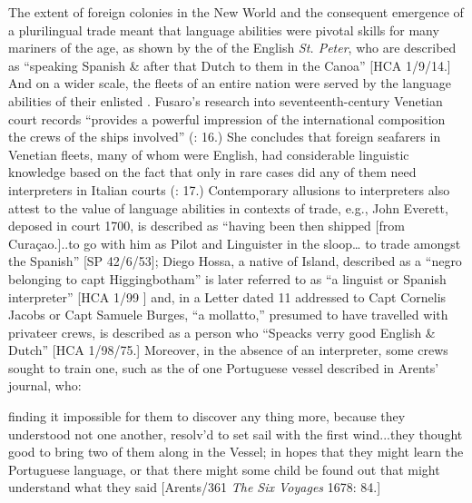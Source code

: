 The extent of foreign colonies in the New World and the consequent emergence of a plurilingual  trade meant that language abilities were pivotal skills for many mariners of the age, as shown by the  of the English \textit{St. Peter}, who are described as “speaking Spanish \& after that Dutch to them in the Canoa” [HCA 1/9/14.] And on a wider scale, the  fleets of an entire nation were served by the language abilities of their enlisted . Fusaro’s research into seventeenth-century Venetian court records “provides a powerful impression of the international composition the crews of the ships involved” (\citeyear*{Fusaro2015}: 16.) She concludes that foreign seafarers in Venetian fleets, many of whom were English, had considerable linguistic knowledge based on the fact that only in rare cases did any of them need interpreters in Italian courts (\citealt{Fusaro2015}: 17.) Contemporary allusions to interpreters also attest to the value of language abilities in contexts of trade, e.g., John Everett, deposed in court 1700, is described as “having been then shipped [from Curaçao.]..to go with him as Pilot and Linguister in the sloop… to trade amongst the Spanish” [SP 42/6/53]; Diego Hossa, a native of  Island, described as a “negro belonging to capt Higgingbotham” is later referred to as “a linguist or Spanish interpreter” [HCA 1/99  \citealt{Islands1722}] and, in a Letter dated 11 \citealt{January1697} addressed to Capt Cornelis Jacobs or Capt Samuele Burges, “a mollatto,” presumed to have travelled with privateer crews, is described as a person who “Speacks verry good English \& Dutch” [HCA 1/98/75.] Moreover, in the absence of an interpreter, some crews sought to train one, such as the  of one Portuguese vessel described in Arents’ journal, who:

finding it impossible for them to discover any thing more, because they understood not one another, resolv’d to set sail with the first wind...they thought good to bring two of them along in the Vessel; in hopes that they might learn the Portuguese language, or that there might some child be found out that might understand what they said [Arents/361 \textit{The Six Voyages} 1678: 84.] 

